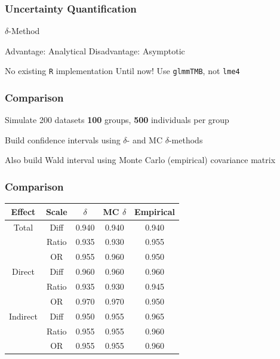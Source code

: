 \documentclass[14pt]{beamer}
\begin{document}
\begin{frame}
    \frametitle{Uncertainty Quantification}
    \begin{outline}
        \1 $\delta$-Method \newline

        \1 Advantage: Analytical
        \1 Disadvantage: Asymptotic \newline

        \1 No existing \texttt{R} implementation
            \2 Until now!
            \2 Use \texttt{glmmTMB}, not \texttt{lme4}
        \end{outline}
\end{frame}


\begin{frame}
    \frametitle{Comparison}
    \begin{outline}
        \1 Simulate 200 datasets
            \2 \textbf{100} groups, \textbf{500} individuals per group \newline

        \1 Build confidence intervals using $\delta$- and MC $\delta$-methods \newline

        \1 Also build Wald interval using Monte Carlo (empirical) covariance matrix
        \end{outline}
\end{frame}

\begin{frame}
    \frametitle{Comparison}
    \begin{table}[h!]
        \centering
        \begin{tabular}{|cc|ccc|}
            \hline
            Effect & Scale & $\delta$ & MC $\delta$ & Empirical\\
            \hline
            Total & Diff & 0.940 & 0.940 & 0.940 \\
            & Ratio & 0.935 & 0.930& 0.955 \\
            & OR & 0.955 & 0.960 & 0.950 \\ 
            \hline
            Direct & Diff & 0.960 & 0.960 & 0.960 \\
            & Ratio & 0.935 & 0.930& 0.945 \\
            & OR & 0.970 & 0.970 & 0.950 \\
            \hline
            Indirect & Diff & 0.950 & 0.955 & 0.965 \\
            & Ratio & 0.955 & 0.955& 0.960 \\
            & OR & 0.955 & 0.955 & 0.960 \\
            \hline
        \end{tabular}
    \end{table}
\end{frame}
\end{document}
